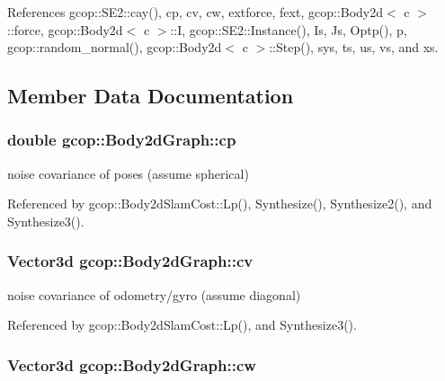 \-References gcop\-::\-S\-E2\-::cay(), cp, cv, cw, extforce, fext, gcop\-::\-Body2d$<$ c $>$\-::force, gcop\-::\-Body2d$<$ c $>$\-::\-I, gcop\-::\-S\-E2\-::\-Instance(), \-Is, \-Js, \-Optp(), p, gcop\-::random\-\_\-normal(), gcop\-::\-Body2d$<$ c $>$\-::\-Step(), sys, ts, us, vs, and xs.



\subsection{\-Member \-Data \-Documentation}
\subsubsection[{cp}]{\setlength{\rightskip}{0pt plus 5cm}double {\bf gcop\-::\-Body2d\-Graph\-::cp}}\label{classgcop_1_1Body2dGraph_a6783913ab4e95009dbf614fc8f0af9e7}


noise covariance of poses (assume spherical) 



\-Referenced by gcop\-::\-Body2d\-Slam\-Cost\-::\-Lp(), \-Synthesize(), \-Synthesize2(), and \-Synthesize3().

\subsubsection[{cv}]{\setlength{\rightskip}{0pt plus 5cm}\-Vector3d {\bf gcop\-::\-Body2d\-Graph\-::cv}}\label{classgcop_1_1Body2dGraph_a890f300e631cf998fc0e8f8802cc4a5a}


noise covariance of odometry/gyro (assume diagonal) 



\-Referenced by gcop\-::\-Body2d\-Slam\-Cost\-::\-Lp(), and \-Synthesize3().

\subsubsection[{cw}]{\setlength{\rightskip}{0pt plus 5cm}\-Vector3d {\bf gcop\-::\-Body2d\-Graph\-::cw}}\label{classgcop_1_1Body2dGraph_aab6e959bacfcb92840ebabf0aad05ed9}


